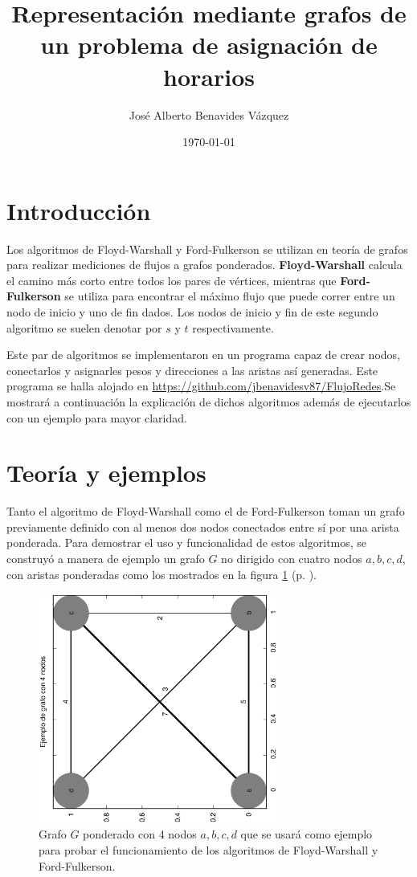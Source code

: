 \documentclass{article}
\title{Representación mediante grafos de un problema de asignación de horarios}
\author{José Alberto Benavides Vázquez}
\date{\today}
\begin{document}
  \maketitle

  \section{Introducción}

  Los algoritmos de Floyd-Warshall y Ford-Fulkerson se utilizan en teoría de grafos para realizar mediciones de flujos a grafos ponderados. \textbf{Floyd-Warshall} calcula el camino más corto entre todos los pares de vértices, mientras que \textbf{Ford-Fulkerson} se utiliza para encontrar el máximo flujo que puede correr entre un nodo de inicio y uno de fin dados. Los nodos de inicio y fin de este segundo algoritmo se suelen denotar por $s$ y $t$ respectivamente.

  Este par de algoritmos se implementaron en un programa capaz de crear nodos, conectarlos y asignarles pesos y direcciones a las aristas así generadas. Este programa se halla alojado en \url{https://github.com/jbenavidesv87/FlujoRedes}.Se mostrará a continuación la explicación de dichos algoritmos además de ejecutarlos con un ejemplo para mayor claridad.

  \section{Teoría y ejemplos}
  Tanto el algoritmo de Floyd-Warshall como el de Ford-Fulkerson toman un grafo previamente definido con al menos dos nodos conectados entre sí por una arista ponderada. Para demostrar el uso y funcionalidad de estos algoritmos, se construyó a manera de ejemplo un grafo $G$ no dirigido con cuatro nodos $a, b, c, d$, con aristas ponderadas como los mostrados en la figura \ref{fig:ejemplo} (p. \pageref{fig:ejemplo}).

  \begin{figure}[h]
    \includegraphics[width=0.7\textwidth, angle=-90]{ejemplo} %
    \centering
    \caption{Grafo $G$ ponderado con 4 nodos $a, b, c, d$ que se usará como ejemplo para probar el funcionamiento de los algoritmos de Floyd-Warshall y Ford-Fulkerson.}
    \label{fig:ejemplo}
  \end{figure}
\end{document}
